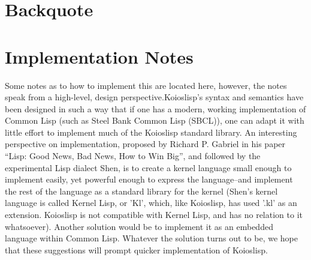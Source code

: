 \documentclass[10pt]{book}
\begin{document}
\chapter{Backquote} 
\chapter{Implementation Notes}
Some notes as to how to implement this are located here, however, the notes speak from a high-level, design perspective.{\sc Koioslisp}'s syntax and semantics have been designed in such a way that if one has a modern, working implementation of {\sc Common Lisp} (such as Steel Bank Common Lisp (SBCL)), one can adapt it with little effort to implement much of the {\sc Koioslisp} standard library. An interesting perspective on implementation, proposed by Richard P. Gabriel in his paper ``Lisp: Good News, Bad News, How to Win Big'', and followed by the experimental Lisp dialect Shen, is to create a kernel language small enough to implement easily, yet powerful enough to express the language--and implement the rest of the language as a standard library for the kernel (Shen's kernel language is called Kernel Lisp, or 'Kl', which, like Koioslisp, has used '.kl' as an extension. Koioslisp is not compatible with Kernel Lisp, and has no relation to it whatsoever). Another solution would be to implement it as an embedded language within Common Lisp. Whatever the solution turns out to be, we hope that these suggestions will prompt quicker implementation of {\sc Koioslisp}.
\end{document}
